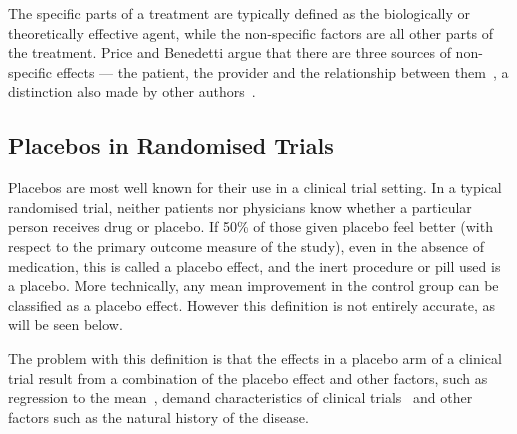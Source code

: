 The specific parts of a treatment are typically defined as the biologically or theoretically effective agent, while the non-specific factors are all other parts of the treatment. Price and Benedetti argue that there are three sources of non-specific effects --- the patient, the provider and the relationship between them~\cite{Price2008}, a distinction also made by other authors~\cite{Finniss2005,DiBlasi2002}.


\subsection{Placebos in Randomised Trials}
\label{sec:plac-rand-trials}

Placebos are most well known for their use in a clinical trial setting. %
In a typical randomised trial, neither patients nor physicians know whether a particular person receives drug or placebo.  If 50\% of those given placebo feel  better (with respect to the primary outcome measure of the study), even in the absence of medication, this is called a placebo effect, and the inert procedure or pill used is a placebo. More technically, any mean improvement in the control group can be classified as a placebo effect. However this definition is not entirely accurate, as will be seen below.   


The problem with this definition is that the effects in a placebo arm of a clinical trial result from a combination of the placebo effect and other factors, such as regression to the mean~\cite{Morton2003}, demand characteristics of clinical trials~\cite{hrobjartsson2001} and other factors such as the natural history of the disease.   


